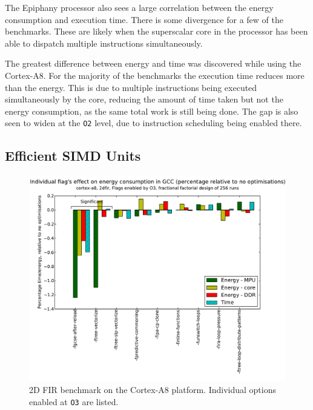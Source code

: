 \documentclass[twocolumn]{article}
\let\oldcaption\caption
\renewcommand{\caption}[1]{\oldcaption{\textup{#1}}}
\begin{document}
The Epiphany processor also sees a large correlation between the energy consumption and execution time. There is some divergence for a few of the benchmarks. These are likely when the superscalar core in the processor has been able to dispatch multiple instructions simultaneously.

The greatest difference between energy and time was discovered while using the Cortex-A8. For the majority of the benchmarks the execution time reduces more than the energy. This is due to multiple instructions being executed simultaneously by the core, reducing the amount of time taken but not the energy consumption, as the same total work is still being done. The gap is also seen to widen at the \texttt{O2} level, due to instruction scheduling being enabled there.


\subsection{Efficient SIMD Units}

\begin{figure}[t!]
	\includegraphics[width=\linewidth,clip,trim=0.5cm 0 2cm 1.8cm]{cortex-a8/O3_main_effects_2dfir.pdf}
	\caption{2D FIR benchmark on the Cortex-A8 platform. Individual options enabled at \texttt{O3} are listed.}
	\label{Fig:O3_2dfir_A8}
\end{figure}
\end{document}
